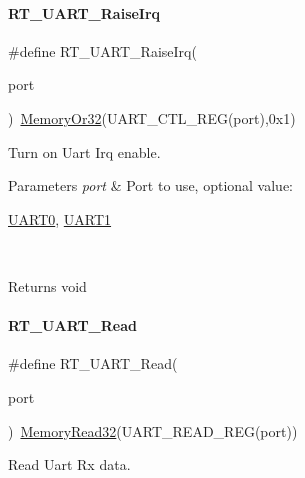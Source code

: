 \paragraph{\texorpdfstring{R\+T\+\_\+\+U\+A\+R\+T\+\_\+\+Raise\+Irq}{RT\_UART\_RaiseIrq}}
{\footnotesize\ttfamily \#define R\+T\+\_\+\+U\+A\+R\+T\+\_\+\+Raise\+Irq(\begin{DoxyParamCaption}\item[{}]{port }\end{DoxyParamCaption})~\mbox{\hyperlink{a00026_a27874a97deab7cecdde5ddecf466e31e}{Memory\+Or32}}(U\+A\+R\+T\+\_\+\+C\+T\+L\+\_\+\+R\+EG(port),0x1)}



Turn on Uart Irq enable. 


\begin{DoxyParams}{Parameters}
{\em port} & Port to use, optional value\+:
\begin{DoxyCode}
\mbox{\hyperlink{a00098_a0508661f121639ffdee7de2353a0def2}{UART0}}, \mbox{\hyperlink{a00098_a8d69bf04d07af4fbbab5a8bd291f65ff}{UART1}}
\end{DoxyCode}
 \\
\hline
\end{DoxyParams}
\begin{DoxyReturn}{Returns}
void 
\end{DoxyReturn}
\mbox{\label{a00098_a7804645fb092b24545278660f6b66409}} 
\paragraph{\texorpdfstring{R\+T\+\_\+\+U\+A\+R\+T\+\_\+\+Read}{RT\_UART\_Read}}
{\footnotesize\ttfamily \#define R\+T\+\_\+\+U\+A\+R\+T\+\_\+\+Read(\begin{DoxyParamCaption}\item[{}]{port }\end{DoxyParamCaption})~\mbox{\hyperlink{a00026_a2d484dc15bdf30ee11ab3b05f31f0e16}{Memory\+Read32}}(U\+A\+R\+T\+\_\+\+R\+E\+A\+D\+\_\+\+R\+EG(port))}



Read Uart Rx data. 


